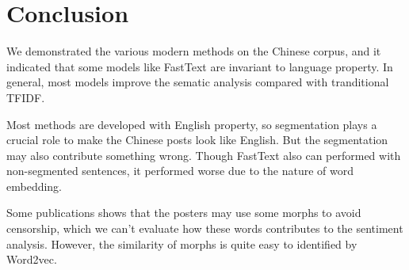 \section{Conclusion}

We demonstrated the various modern methods on the Chinese corpus, and it indicated that some models like FastText are invariant to language property. 
In general, most models improve the sematic analysis compared with tranditional TFIDF.

Most methods are developed with English property, so segmentation plays a crucial role to make the Chinese posts look like English.
 But the segmentation may also contribute something wrong. Though FastText also can performed with non-segmented sentences, it performed worse due to the nature of word embedding.

Some publications\cite{Chen2013TUP251293825} shows that the posters may use some morphs to avoid censorship, which we can't evaluate how these words contributes to the sentiment analysis. 
 However, the similarity of morphs is quite easy to identified by Word2vec. 